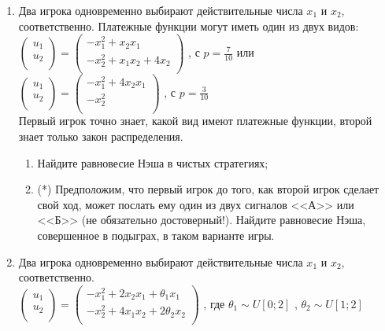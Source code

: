 \documentclass[pdftex,12pt,a4paper]{article}
\begin{document}
\begin{enumerate}
\item Два игрока одновременно выбирают действительные числа $x_1 $ и $x_2 $, соответственно. Платежные функции могут иметь один из двух видов:\\
$\left( \begin{array}{l}
 u_1  \\ 
 u_2  \\ 
 \end{array} \right) = \left( \begin{array}{l}
  - x_1^2  + x_2 x_1  \\ 
  - x_2^2  + x_1 x_2  + 4x_2  \\ 
 \end{array} \right)$
, с  $p=\frac{7}{{10}}$ или 
$\left( \begin{array}{l}
 u_1  \\ 
 u_2  \\ 
 \end{array} \right) = \left( \begin{array}{l}
  - x_1^2  + 4x_2 x_1  \\ 
  - x_2^2  \\ 
 \end{array} \right)$
, с  $p=\frac{3}{{10}}$\\
Первый игрок точно знает, какой вид имеют платежные функции, второй знает только закон распределения.
\begin{enumerate}
\item Найдите равновесие Нэша в чистых стратегиях;
\item (*) Предположим, что первый игрок до того, как второй игрок сделает свой ход, может послать ему один из двух сигналов <<А>> или <<Б>> (не обязательно достоверный!). Найдите равновесие Нэша, совершенное в подыграх, в таком варианте игры. 
\end{enumerate}

\item Два игрока одновременно выбирают действительные числа $x_1$ и $x_2$, соответственно.\\
$\left( \begin{array}{l}
 u_1  \\ 
 u_2  \\ 
 \end{array} \right) = \left( \begin{array}{l}
  - x_1^2  + 2x_2 x_1  + \theta _1 x_1  \\ 
  - x_2^2  + 4x_1 x_2  + 2\theta _2 x_2  \\ 
 \end{array} \right)$
, где $\theta _1  \sim U\left[ {0;2} \right]$
, $\theta _2  \sim U\left[ {1;2} \right]$\\


\end{enumerate}
\end{document}
